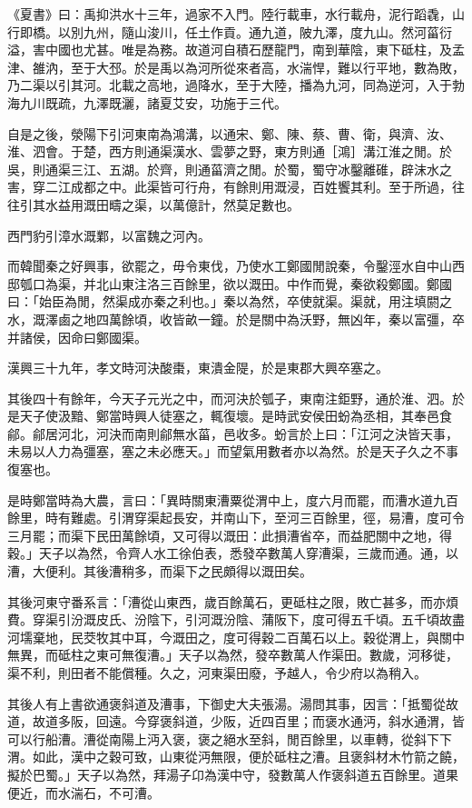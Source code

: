 
\begin{pinyinscope}
《夏書》曰：禹抑洪水十三年，過家不入門。陸行載車，水行載舟，泥行蹈毳，山行即橋。以別九州，隨山浚川，任土作貢。通九道，陂九澤，度九山。然河菑衍溢，害中國也尤甚。唯是為務。故道河自積石歷龍門，南到華陰，東下砥柱，及孟津、雒汭，至于大邳。於是禹以為河所從來者高，水湍悍，難以行平地，數為敗，乃二渠以引其河。北載之高地，過降水，至于大陸，播為九河，同為逆河，入于勃海九川既疏，九澤既灑，諸夏艾安，功施于三代。

自是之後，滎陽下引河東南為鴻溝，以通宋、鄭、陳、蔡、曹、衛，與濟、汝、淮、泗會。于楚，西方則通渠漢水、雲夢之野，東方則通［鴻］溝江淮之閒。於吳，則通渠三江、五湖。於齊，則通菑濟之閒。於蜀，蜀守冰鑿離碓，辟沫水之害，穿二江成都之中。此渠皆可行舟，有餘則用溉浸，百姓饗其利。至于所過，往往引其水益用溉田疇之渠，以萬億計，然莫足數也。

西門豹引漳水溉鄴，以富魏之河內。

而韓聞秦之好興事，欲罷之，毋令東伐，乃使水工鄭國閒說秦，令鑿涇水自中山西邸瓠口為渠，并北山東注洛三百餘里，欲以溉田。中作而覺，秦欲殺鄭國。鄭國曰：「始臣為閒，然渠成亦秦之利也。」秦以為然，卒使就渠。渠就，用注填閼之水，溉澤鹵之地四萬餘頃，收皆畝一鐘。於是關中為沃野，無凶年，秦以富彊，卒并諸侯，因命曰鄭國渠。

漢興三十九年，孝文時河決酸棗，東潰金隄，於是東郡大興卒塞之。

其後四十有餘年，今天子元光之中，而河決於瓠子，東南注鉅野，通於淮、泗。於是天子使汲黯、鄭當時興人徒塞之，輒復壞。是時武安侯田蚡為丞相，其奉邑食鄃。鄃居河北，河決而南則鄃無水菑，邑收多。蚡言於上曰：「江河之決皆天事，未易以人力為彊塞，塞之未必應天。」而望氣用數者亦以為然。於是天子久之不事復塞也。

是時鄭當時為大農，言曰：「異時關東漕粟從渭中上，度六月而罷，而漕水道九百餘里，時有難處。引渭穿渠起長安，并南山下，至河三百餘里，徑，易漕，度可令三月罷；而渠下民田萬餘頃，又可得以溉田：此損漕省卒，而益肥關中之地，得穀。」天子以為然，令齊人水工徐伯表，悉發卒數萬人穿漕渠，三歲而通。通，以漕，大便利。其後漕稍多，而渠下之民頗得以溉田矣。

其後河東守番系言：「漕從山東西，歲百餘萬石，更砥柱之限，敗亡甚多，而亦煩費。穿渠引汾溉皮氏、汾陰下，引河溉汾陰、蒲阪下，度可得五千頃。五千頃故盡河壖棄地，民茭牧其中耳，今溉田之，度可得穀二百萬石以上。穀從渭上，與關中無異，而砥柱之東可無復漕。」天子以為然，發卒數萬人作渠田。數歲，河移徙，渠不利，則田者不能償種。久之，河東渠田廢，予越人，令少府以為稍入。

其後人有上書欲通褒斜道及漕事，下御史大夫張湯。湯問其事，因言：「抵蜀從故道，故道多阪，回遠。今穿褒斜道，少阪，近四百里；而褒水通沔，斜水通渭，皆可以行船漕。漕從南陽上沔入褒，褒之絕水至斜，閒百餘里，以車轉，從斜下下渭。如此，漢中之穀可致，山東從沔無限，便於砥柱之漕。且褒斜材木竹箭之饒，擬於巴蜀。」天子以為然，拜湯子卬為漢中守，發數萬人作褒斜道五百餘里。道果便近，而水湍石，不可漕。


\end{pinyinscope}
